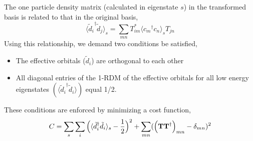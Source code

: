 The one particle density matrix (calculated in eigenstate $s$) 
in the transformed basis is related to that in the original basis,
\begin{equation}
	\langle {\tilde{d}_i}^{\dagger} \tilde{d}_{j} \rangle_{s} = \sum_{mn} T^{*}_{im} \langle {c_m}^{\dagger} c_n \rangle_{s} T_{jn}
\end{equation}
Using this relationship, we demand two conditions be satisfied,
\begin{itemize} 
 \item The effective orbitals ($\tilde{d}_i$) are orthogonal to each other 
 \item All diagonal entries of the 1-RDM of the effective orbitals for all low energy eigenstates 
       $(\langle {\tilde{d}_i}^{\dagger} \tilde{d}_{i} \rangle)$ 
       equal 1/2.
\end{itemize} 
These conditions are enforced by minimizing a cost function,
\begin{equation}
	C = \sum_{s} \sum_{i} \Big( \langle {\tilde{d}_i}^{\dagger} \tilde{d}_{i} \rangle_{s} - \frac{1}{2} \Big)^{2} + \sum_{mn} ( \Big({\bf T} {\bf T}^{\dagger}\Big)_{mn} -\delta_{mn})^{2}
\end{equation} 

